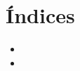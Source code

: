\documentclass[letterpaper,10pt,brazil]{sphinxmanual}
\begin{document}
\chapter{Índices}
\label{\detokenize{index:indices}}\begin{itemize}
\item {} 
\sphinxAtStartPar
{}

\item {} 
\sphinxAtStartPar
{}

\end{itemize}


\renewcommand{\indexname}{Python Module Index}
\begin{sphinxtheindex}
\let\bigletter\sphinxstyleindexlettergroup
\bigletter{a}
\item\relax{}
\end{sphinxtheindex}

\renewcommand{\indexname}{Index}
\printindex
\end{document}
